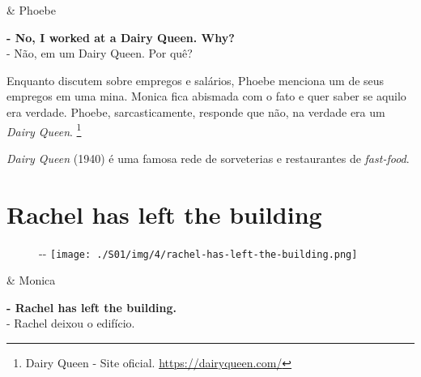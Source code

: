 \begin{tcolorbox}[enhanced,center upper,
    drop fuzzy shadow southeast, boxrule=0.3pt,
    lower separated=false, breakable,
    colframe=black!30!dialogoBorder,colback=white]
\medskip
\begin{minipage}[c]{0.16\linewidth}
   & \centering \scriptsize{Phoebe}
\end{minipage}
\hfill
\begin{minipage}[c]{0.8\linewidth}
  \textbf{- No, I worked at a Dairy Queen. Why?}\\
  - Não, em um Dairy Queen. Por quê?
\end{minipage}
\end{tcolorbox}

Enquanto discutem sobre empregos e salários, Phoebe menciona um de seus
empregos em uma mina. Monica fica abismada com o fato e quer saber se
aquilo era verdade. Phoebe, sarcasticamente, responde que não, na
verdade era um \emph{Dairy Queen}. \footnote{\sloppy Dairy Queen - Site oficial. \url{https://dairyqueen.com/}}

\emph{Dairy Queen} (1940) é uma famosa rede de sorveterias e
restaurantes de \emph{fast-food}.

\hypertarget{rachel-has-left-the-building}{%
\section{Rachel has left the
building}\label{rachel-has-left-the-building}}

\begin{figure}[!ht]
  \begin{adjustwidth}{-\oddsidemargin-1in}{-\rightmargin}
    \centering
    \texttt{[image: ./S01/img/4/rachel-has-left-the-building.png]}
  \end{adjustwidth}
\end{figure}

\begin{tcolorbox}[enhanced,center upper,
    drop fuzzy shadow southeast, boxrule=0.3pt,
    lower separated=false, breakable,
    colframe=black!30!dialogoBorder,colback=white]
\begin{minipage}[c]{0.16\linewidth}
   & \centering \scriptsize{Monica}
\end{minipage}
\hfill
\begin{minipage}[c]{0.8\linewidth}
  \textbf{- Rachel has left the building.}\\
  - Rachel deixou o edifício.
\end{minipage}
\end{tcolorbox}

